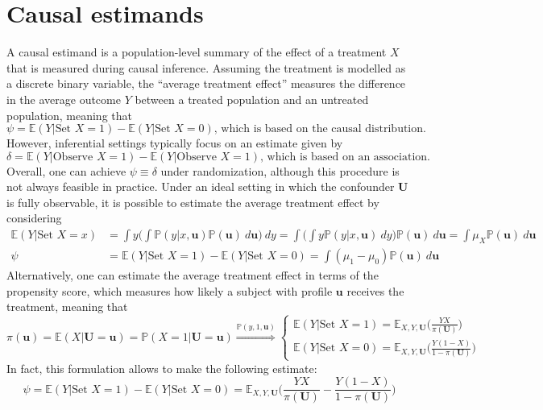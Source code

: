 \documentclass{report}
\begin{document}
\section{Causal estimands}
A causal estimand is a population-level summary of the effect of a treatment $\displaystyle X$ that is measured during causal inference. \newline
Assuming the treatment is modelled as a discrete binary variable, the ``average treatment effect'' measures the difference in the average outcome $\displaystyle Y$ between a treated population and an untreated population, meaning that
\[\psi = \mathbb{E}(Y|\text{Set } X = 1) - \mathbb{E}(Y|\text{Set } X = 0) \text{, which is based on the causal distribution.}\]
However, inferential settings typically focus on an estimate given by
\[\delta = \mathbb{E}(Y|\text{Observe } X = 1) - \mathbb{E}(Y|\text{Observe } X = 1) \text{, which is based on an association.}\]
Overall, one can achieve $\displaystyle \psi \equiv \delta$ under randomization, although this procedure is not always feasible in practice. \newline
Under an ideal setting in which the confounder $\displaystyle \mathbf{U}$ is fully observable, it is possible to estimate the average treatment effect by considering
\begin{align*}
    \mathbb{E}(Y|\text{Set }X = x) &= \int y \Bigg(\int \mathbb{P}(y|x, \mathbf{u})\mathbb{P}(\mathbf{u}) \ d\mathbf{u}\Bigg) \ dy = \int\Bigg(\int y\mathbb{P}(y|x, \mathbf{u}) \ dy\Bigg) \mathbb{P}(\mathbf{u}) \ d\mathbf{u} = \int \mu_X\mathbb{P}(\mathbf{u}) \ d\mathbf{u} \\
    \psi &= \mathbb{E}(Y|\text{Set }X = 1) - \mathbb{E}(Y|\text{Set }X = 0) = \int (\mu_1 - \mu_0)\mathbb{P}(\mathbf{u}) \ d\mathbf{u}
\end{align*}
Alternatively, one can estimate the average treatment effect in terms of the propensity score, which measures how likely a subject with profile $\displaystyle \mathbf{u}$ receives the treatment, meaning that
\[\pi(\mathbf{u}) = \mathbb{E}(X|\mathbf{U} = \mathbf{u}) = \mathbb{P}(X = 1|\mathbf{U} = \mathbf{u}) \stackrel{\mathbb{P}(y, 1, \mathbf{u})}{\Rightarrow} \begin{cases}
    \mathbb{E}(Y|\text{Set }X = 1) = \mathbb{E}_{X, Y, \mathbf{U}}\bigg(\frac{YX}{\pi(\mathbf{U})}\bigg) \\
    \mathbb{E}(Y|\text{Set }X = 0) = \mathbb{E}_{X, Y, \mathbf{U}}\bigg(\frac{Y(1 - X)}{1 - \pi(\mathbf{U})}\bigg)
\end{cases}\]
In fact, this formulation allows to make the following estimate:
\[\psi = \mathbb{E}(Y|\text{Set }X = 1) - \mathbb{E}(Y|\text{Set }X = 0) = \mathbb{E}_{X, Y, \mathbf{U}}\Bigg(\frac{YX}{\pi(\mathbf{U})} - \frac{Y(1 - X)}{1 - \pi(\mathbf{U})}\Bigg)\]
\end{document}
